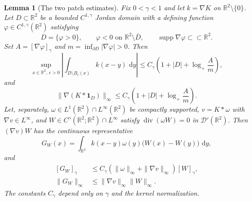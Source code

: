 \documentclass[11pt]{amsart}
\newtheorem{lemma}[theorem]{Lemma}
\theoremstyle{remark}
\numberwithin{equation}{section}
\newcommand{\R}{\mathbb R}
\newcommand{\dd}{\,\mathrm d}
\begin{document}
\begin{lemma}[The two patch estimates]
\label{np:patch-estimates}
Fix $0<\gamma<1$ and let $k=\nabla K$ on $\R^2\setminus\{0\}$.
Let $D\subset\R^2$ be a bounded $C^{1,\gamma}$ Jordan domain with
a defining function $\varphi\in C^{1,\gamma}(\R^2)$ satisfying
\[
 D=\{\varphi>0\},\qquad \varphi<0\text{ on }\R^2\setminus\overline D,
 \qquad \operatorname{supp}\nabla\varphi\subset\subset\R^2.
\]
Set $A=[\nabla\varphi]_\gamma$ and
$m=\inf_{\partial D}|\nabla\varphi|>0$. Then
\begin{equation}\label{np:patch-log}
 \sup_{x\in\R^2,\,\epsilon>0}
 \left|\int_{D\setminus B_\epsilon(x)}k(x-y)\,\dd y\right|
 \le C_\gamma\left(1+|D|+\log_+\frac A m\right),
\end{equation}
and
\[
 \|\nabla(K*\mathbf1_D)\|_\infty
 \le C_\gamma\left(1+|D|+\log_+\frac A m\right).
\]
Let, separately, $\omega\in L^1(\R^2)\cap L^\infty(\R^2)$ be
compactly supported, $v=K*\omega$ with $\nabla v\in L^\infty$,
and $W\in C^\gamma(\R^2;\R^2)\cap L^\infty$ satisfy
$\operatorname{div}(\omega W)=0$ in $\mathcal D'(\R^2)$.
Then $(\nabla v)W$ has the continuous representative
\begin{equation}\label{np:patch-commutator}
 G_W(x)=\int_{\R^2}k(x-y)\omega(y)
                    \bigl(W(x)-W(y)\bigr)\,\dd y,
\end{equation}
and
\begin{equation}\label{np:patch-commutator-bound}
 \begin{split}
 [G_W]_\gamma&\le
 C_\gamma(\|\omega\|_\infty+\|\nabla v\|_\infty)[W]_\gamma,\\
 \|G_W\|_\infty&\le\|\nabla v\|_\infty\|W\|_\infty.
 \end{split}
\end{equation}
The constants $C_\gamma$ depend only on $\gamma$ and the kernel normalization.
\end{lemma}
\end{document}
